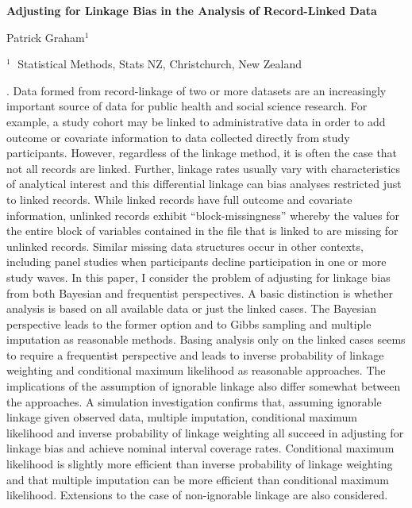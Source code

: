 \documentclass[12pt]{article}
\begin{document}
\begin{flushleft}


{\LARGE\bf Adjusting for Linkage Bias in the Analysis of Record-Linked Data
}


\vspace{1.0cm}

Patrick Graham$^1$ 

\begin{description}

\item $^1 \;$ Statistical Methods, Stats NZ,
Christchurch, New Zealand

\end{description}

\end{flushleft}


\vspace{0.75cm}

. Data formed from record-linkage of two or more datasets are an increasingly important source of data for public health and social science research.  For example, a study cohort may be linked to administrative data in order to add outcome or covariate information to data collected directly from study participants.  However, regardless of the linkage method, it is often the case that not all records are linked.  Further, linkage rates usually vary with characteristics of analytical interest and this differential linkage can bias analyses restricted just to linked records.  While linked records have full outcome and covariate information, unlinked records exhibit “block-missingness” whereby the values for the entire block of variables contained in the file that is linked to are missing for unlinked records. Similar missing data structures occur in other contexts, including panel studies when participants decline participation in one or more study waves.  In this paper, I consider the problem of adjusting for linkage bias from both Bayesian and frequentist perspectives. A basic distinction is whether analysis is based on all available data or just the linked cases. The Bayesian perspective leads to the former option and to Gibbs sampling and multiple imputation as reasonable methods. Basing analysis only on the linked cases seems to require a frequentist perspective and leads to inverse probability of linkage weighting and conditional maximum likelihood as reasonable approaches.  The implications of the assumption of ignorable linkage also differ somewhat between the approaches. A simulation investigation confirms that, assuming ignorable linkage given observed data, multiple imputation, conditional maximum likelihood and inverse probability of linkage weighting all succeed in adjusting for linkage bias and achieve nominal interval coverage rates. Conditional maximum likelihood is slightly more efficient than inverse probability of linkage weighting and that multiple imputation can be more efficient than conditional maximum likelihood. Extensions to the case of non-ignorable linkage are also considered.
\end{document}
